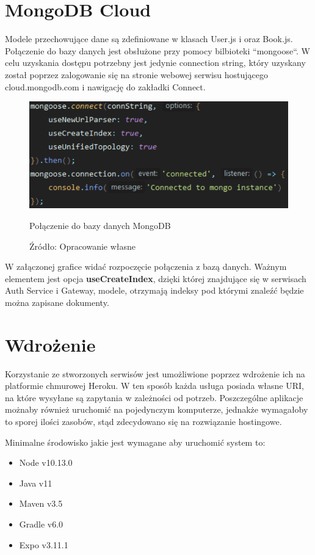 
\section{MongoDB Cloud}
 
Modele przechowujące dane są zdefiniowane w klasach User.js i
oraz Book.js. Połączenie do bazy danych jest obsłużone przy pomocy bilbioteki ``mongoose``. W celu uzyskania dostępu potrzebny jest jedynie connection string, który uzyskany został poprzez zalogowanie się na stronie webowej serwisu hostującego cloud.mongodb.com i nawigację do zakładki Connect.
\begin{figure}[H]
	\centering
	\includegraphics[width=\linewidth]{mongo.pdf}
	\caption{Połączenie do bazy danych MongoDB}
	\caption*{Źródło: {Opracowanie własne}}
\end{figure}
W załączonej grafice widać rozpoczęcie połączenia z bazą danych. Ważnym elementem jest opcja \textbf{useCreateIndex}, dzięki której znajdujące się w serwisach Auth Service i Gateway, modele, otrzymają indeksy pod którymi znaleźć będzie można zapisane dokumenty. 


\section{Wdrożenie}

Korzystanie ze stworzonych serwisów jest umożliwione poprzez wdrożenie ich na platformie chmurowej Heroku.
W ten sposób każda usługa posiada własne URI, na które wysyłane są zapytania w zależności od potrzeb.
Poszczególne aplikacje możnaby również uruchomić na pojedynczym komputerze, jednakże wymagałoby to sporej ilości zasobów, stąd zdecydowano się na rozwiązanie hostingowe.

Minimalne środowisko jakie jest wymagane aby uruchomić system to:
\begin{itemize}
	\item Node v10.13.0
	\item Java v11
	\item Maven v3.5
	\item Gradle v6.0
	\item Expo v3.11.1
\end{itemize}

